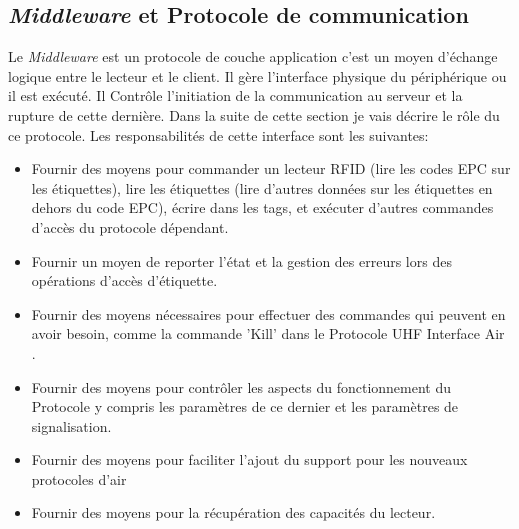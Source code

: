 \documentclass[11pt, a4paper, twoside]{book}
\begin{document}
\subsection{\emph{Middleware} et Protocole de communication}
Le \emph{Middleware} est un protocole de couche application c'est un moyen d'échange logique entre le lecteur et le client. Il gère l'interface physique du périphérique ou il est exécuté. Il Contrôle l'initiation de la communication au serveur et la rupture de cette dernière. Dans la suite de cette section je vais décrire le rôle du ce protocole. Les responsabilités de cette interface sont les suivantes:
\begin{itemize}
\item Fournir des moyens pour commander un lecteur RFID  (lire les codes EPC sur les étiquettes), lire les étiquettes (lire d'autres données sur les étiquettes en dehors du code EPC), écrire dans les tags, et exécuter d'autres commandes d'accès du protocole dépendant.
\item 
Fournir un moyen de reporter l'état et la gestion des erreurs lors des opérations d'accès d'étiquette.
\item 
Fournir des moyens  nécessaires pour effectuer des commandes qui peuvent en avoir besoin, comme la commande 'Kill' dans le Protocole UHF Interface Air \cite{air}.
\item 
Fournir des moyens pour contrôler les aspects du fonctionnement du Protocole y compris les paramètres de ce dernier  et les paramètres de signalisation.
\item 
Fournir des moyens pour faciliter l'ajout du support pour les nouveaux protocoles d'air
\item 
Fournir des moyens pour la récupération des capacités du lecteur.\\
\end{itemize}
\end{document}
